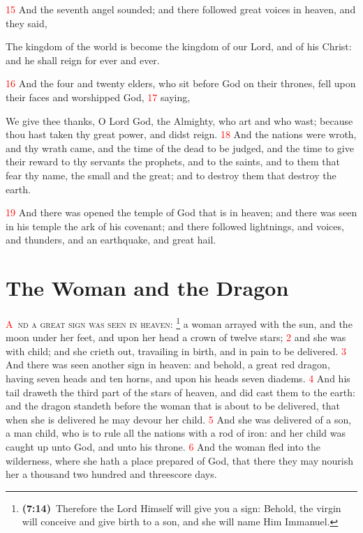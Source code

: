 \documentclass[12pt,twoside]{memoir}
\newcommand{\cbibleref}[3]{\textbf{\ibibleverse{#1}(#2)}\ {#3}}
\newcommand{\cbiblefoot}[3]{\footnote{\cbibleref{#1}{#2}{#3}}}
\newcommand{\vnum}[1]{\textcolor{red}{\normalsize{#1}}}
\begin{document}
\vnum{15} And the seventh angel sounded; and there followed great voices in heaven, and they said,

The kingdom of the world is become the kingdom of our Lord, and of his Christ: and he shall reign for ever and ever.

\vnum{16} And the four and twenty elders, who sit before God on their thrones, fell upon their faces and worshipped God, 
\vnum{17} saying,

We give thee thanks, O Lord God, the Almighty, who art and who wast; because thou hast taken thy great power, and didst reign. 
\vnum{18} And the nations were wroth, and thy wrath came, and the time of the dead to be judged, and the time to give their reward to thy servants the prophets, and to the saints, and to them that fear thy name, the small and the great; and to destroy them that destroy the earth.

\vnum{19} And there was opened the temple of God that is in heaven; and there was seen in his temple the ark of his covenant; and there followed lightnings, and voices, and thunders, and an earthquake, and great hail.



\chapter{The Woman and the Dragon}
\lettrine[lines=3,slope=0.5em]{\textcolor{red}{A}}{\ nd a great sign was seen in heaven}:%
	\cbiblefoot{Isaiah}{7:14}{Therefore the Lord Himself will give you a sign: Behold, the virgin will conceive and give birth to a son, and she will name Him Immanuel.}%
 a woman arrayed with the sun, and the moon under her feet, and upon her head a crown of twelve stars; 
\vnum{2} and she was with child; and she crieth out, travailing in birth, and in pain to be delivered. 
\vnum{3} And there was seen another sign in heaven: and behold, a great red dragon, having seven heads and ten horns, and upon his heads seven diadems. 
\vnum{4} And his tail draweth the third part of the stars of heaven, and did cast them to the earth: and the dragon standeth before the woman that is about to be delivered, that when she is delivered he may devour her child. 
\vnum{5} And she was delivered of a son, a man child, who is to rule all the nations with a rod of iron: and her child was caught up unto God, and unto his throne. 
\vnum{6} And the woman fled into the wilderness, where she hath a place prepared of God, that there they may nourish her a thousand two hundred and threescore days.
\end{document}
